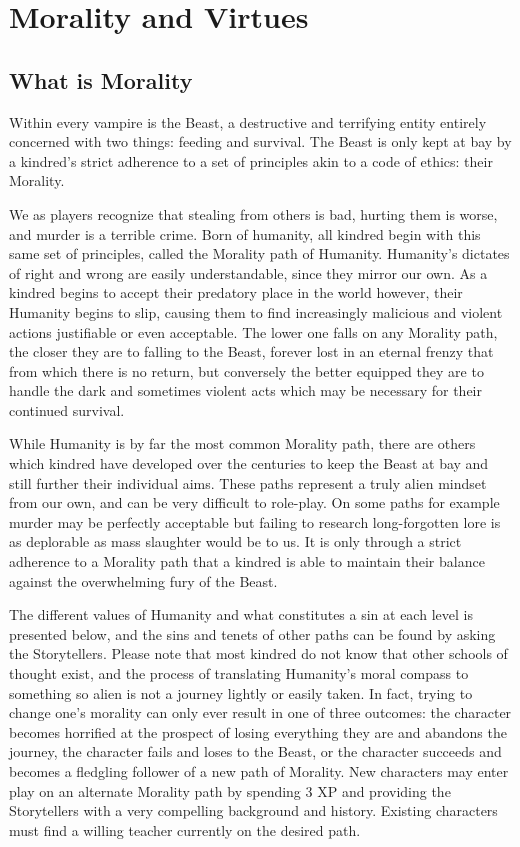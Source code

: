 \section{Morality and Virtues}
\label{sec:morality}
\subsection{What is Morality}
Within every vampire is the Beast, a destructive and terrifying entity 
entirely concerned with two things:  feeding and survival.  The Beast 
is only kept at bay by a kindred's strict adherence to a set of 
principles akin to a code of ethics:  their Morality.

We as players recognize that stealing from others is bad, hurting them 
is worse, and murder is a terrible crime.  Born of humanity, all kindred 
begin with this same set of principles, called the Morality path of 
Humanity.  Humanity's dictates of right and wrong are easily understandable, 
since they mirror our own.  As a kindred begins to accept their predatory 
place in the world however, their Humanity begins to slip, causing them 
to find increasingly malicious and violent actions justifiable or 
even acceptable.  The lower one falls on any Morality path, the closer they 
are to falling to the Beast, forever lost in an eternal frenzy that from 
which there is no return, but conversely the better equipped they are to 
handle the dark and sometimes violent acts which may be necessary for their 
continued survival.

While Humanity is by far the most common Morality path, there are 
others which kindred have developed over the centuries to keep the Beast 
at bay and still further their individual aims.  These paths represent a 
truly alien mindset from our own, and can be very difficult to role-play.  
On some paths for example murder may be perfectly acceptable but failing 
to research long-forgotten lore is as deplorable as mass slaughter would 
be to us.  It is only through a strict adherence to a Morality path that 
a kindred is able to maintain their balance against the overwhelming 
fury of the Beast.

The different values of Humanity and what constitutes a sin at each level 
is presented below, and the sins and tenets of other paths can be found 
by asking the Storytellers.  Please note that most kindred do not know that 
other schools of thought exist, and the process of translating Humanity's 
moral compass to something so alien is not a journey lightly or easily taken.  
In fact, trying to change one's morality can only ever result in one of 
three outcomes:  the character becomes horrified at the prospect 
of losing everything they are and abandons the journey, the character 
fails and loses to the Beast, or the character succeeds and becomes a 
fledgling follower of a new path of Morality.  New characters may enter 
play on an alternate Morality path by spending 3 XP and providing the 
Storytellers with a very compelling background and history.  Existing 
characters must find a willing teacher currently on the desired path.


